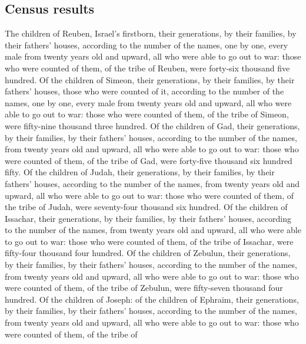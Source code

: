 \hypertarget{census-results}{%
\subsection{Census results}\label{census-results}}

 The children of Reuben, Israel's firstborn, their
generations, by their families, by their fathers' houses, according to
the number of the names, one by one, every male from twenty years old
and upward, all who were able to go out to war:  those
who were counted of them, of the tribe of Reuben, were forty-six
thousand five hundred.  Of the children of Simeon, their
generations, by their families, by their fathers' houses, those who were
counted of it, according to the number of the names, one by one, every
male from twenty years old and upward, all who were able to go out to
war:  those who were counted of them, of the tribe of
Simeon, were fifty-nine thousand three hundred.  Of the
children of Gad, their generations, by their families, by their fathers'
houses, according to the number of the names, from twenty years old and
upward, all who were able to go out to war:  those who
were counted of them, of the tribe of Gad, were forty-five thousand six
hundred fifty.  Of the children of Judah, their
generations, by their families, by their fathers' houses, according to
the number of the names, from twenty years old and upward, all who were
able to go out to war:  those who were counted of them,
of the tribe of Judah, were seventy-four thousand six hundred.
 Of the children of Issachar, their generations, by their
families, by their fathers' houses, according to the number of the
names, from twenty years old and upward, all who were able to go out to
war:  those who were counted of them, of the tribe of
Issachar, were fifty-four thousand four hundred.  Of the
children of Zebulun, their generations, by their families, by their
fathers' houses, according to the number of the names, from twenty years
old and upward, all who were able to go out to war: 
those who were counted of them, of the tribe of Zebulun, were
fifty-seven thousand four hundred.  Of the children of
Joseph: of the children of Ephraim, their generations, by their
families, by their fathers' houses, according to the number of the
names, from twenty years old and upward, all who were able to go out to
war:  those who were counted of them, of the tribe of
